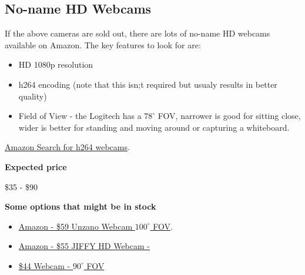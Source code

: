 \subsection{No-name HD Webcams}
\label{sec:equipment::no-name}
\begin{gram}
\label{grm:equipment::no-name::main}
If the above cameras are sold out, there are lots of no-name HD webcams available on Amazon. 
The key features to look for are:

\begin{itemize}
	\item HD 1080p resolution
	\item h264 encoding (note that this isn;t required but usualy results in better quality)
	\item Field of View - the Logitech has a $78^{\circ}$ FOV, narrower is good for sitting close, wider is better for standing and moving around or capturing a whiteboard.
\end{itemize}
%

\href{https://www.amazon.com/s?k=h264+webcam&ref=nb_sb_noss_2}{Amazon Search for h264 webcams}.

\textbf{Expected price}

\$35 - \$90

\textbf{Some options that might be in stock}

\begin{itemize}
\item
\href{https://www.amazon.com/Widescreen-Calling-Recording-Digital-Microphone/dp/B07925CYP5/ref=sr_1_7_sspa?dchild=1&keywords=h264+webcam&qid=1597071160&sr=8-7-spons&psc=1&smid=AWO8QGEAIYIUK&spLa=ZW5jcnlwdGVkUXVhbGlmaWVyPUExRVNTTjJZRURLNFE3JmVuY3J5cHRlZElkPUEwMjUzMDY0VzI3Nkw0RlVaQzg4JmVuY3J5cHRlZEFkSWQ9QTAyMDgyNzIyOUtNWjUwUVZEVktPJndpZGdldE5hbWU9c3BfbXRmJmFjdGlvbj1jbGlja1JlZGlyZWN0JmRvTm90TG9nQ2xpY2s9dHJ1ZQ==}{Amazon - \$59 Unzano Webcam $100^{\circ}$ FOV}.
\item 
\href{https://www.amazon.com/JIFFY-Upgrade-Microphones-Recording-Compatible/dp/B07CMG3ZN4/ref=sr_1_2_sspa?dchild=1&keywords=h264+webcam&qid=1597071160&sr=8-2-spons&psc=1&spLa=ZW5jcnlwdGVkUXVhbGlmaWVyPUExRVNTTjJZRURLNFE3JmVuY3J5cHRlZElkPUEwMjUzMDY0VzI3Nkw0RlVaQzg4JmVuY3J5cHRlZEFkSWQ9QTA1MzEzMjYxSEFLOTlPS05WWUNWJndpZGdldE5hbWU9c3BfYXRmJmFjdGlvbj1jbGlja1JlZGlyZWN0JmRvTm90TG9nQ2xpY2s9dHJ1ZQ==}{Amazon - \$55 JIFFY HD Webcam - }
\item
\href{https://www.amazon.com/TedGem-Streaming-Microphone-Widescreen-Conferencing/dp/B07R3KKBPD/ref=sr_1_4?dchild=1&keywords=h264+webcam&qid=1597071160&sr=8-4}{\$44 Webcam - $90^{\circ}$ FOV}
\end{itemize}

\end{gram}


